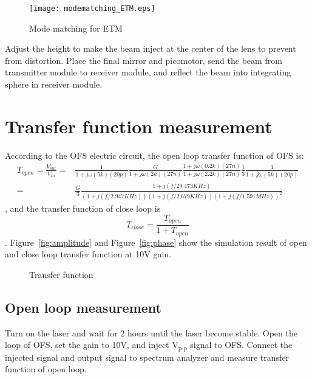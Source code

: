 \begin{figure}
	\begin{center}
		\texttt{[image: modematching\_ETM.eps]}
		\caption{Mode matching for ETM}
		\label{fig:modematching_ETM} 
	\end{center}
\end{figure}

Adjust the height to make the beam inject at the center of the lens to prevent from distortion. Place the final mirror and picomotor, send the beam from transmitter module to receiver module, and reflect the beam into integrating sphere in receiver module.

\section{Transfer function measurement}
\label{tfMeasure}
According to the OFS electric circuit, the open loop transfer function of OFS is:
\begin{eqnarray}
T_{open}=\frac{V_{out}}{V_{in}}=&\frac{1}{1+j\omega(5k)(20p)}\frac{G}{1+j\omega(2k)(27n)}\frac{1+j\omega(0.2k)(27n)}{1+j\omega(2.2k)(27n)}\frac{1}{3}\frac{1}{1+j\omega(5k)(20p)}\\
=&\frac{G}{3}\frac{1+j(f/29.473KHz)}{(1+j(f/2.947KHz))(1+j(f/2.679KHz))(1+j(f/1.591MHz))^{2}}
\end{eqnarray},
and the transfer function of close loop is 
\begin{equation}
T_{close}=\frac{T_{open}}{1+T_{open}}
\end{equation}.
Figure~\ref{fig:amplitude} and Figure~\ref{fig:phase} show the simulation result of open and close loop transfer function at 10V gain.

\begin{figure}
	\begin{center}
	\caption{Transfer function}
	\label{fig:transferfunction}
	\end{center}
\end{figure}


\subsection{Open loop measurement}
\label{OFS_OLTF}
Turn on the laser and wait for 2 hours until the laser become stable. Open the loop of OFS, set the gain to 10V, and inject \underline{\qquad} $\mbox{V}_{\mbox{p-p}}$ signal to OFS. Connect the injected signal and output signal to spectrum analyzer and measure transfer function of open loop.
